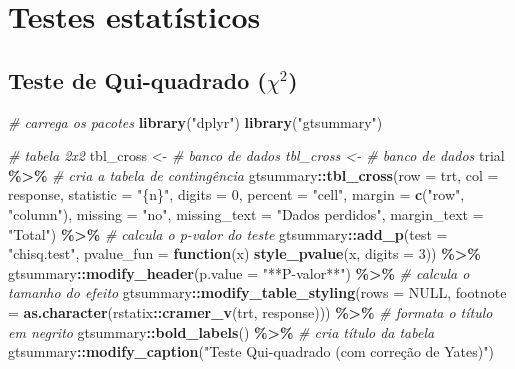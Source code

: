\documentclass[
]{book}
\newenvironment{Shaded}{\begin{snugshade}}{\end{snugshade}}
\newcommand{\AttributeTok}[1]{\textcolor[rgb]{0.13,0.29,0.53}{#1}}
\newcommand{\CommentTok}[1]{\textcolor[rgb]{0.56,0.35,0.01}{\textit{#1}}}
\newcommand{\ConstantTok}[1]{\textcolor[rgb]{0.56,0.35,0.01}{#1}}
\newcommand{\ControlFlowTok}[1]{\textcolor[rgb]{0.13,0.29,0.53}{\textbf{#1}}}
\newcommand{\DecValTok}[1]{\textcolor[rgb]{0.00,0.00,0.81}{#1}}
\newcommand{\FunctionTok}[1]{\textcolor[rgb]{0.13,0.29,0.53}{\textbf{#1}}}
\newcommand{\NormalTok}[1]{#1}
\newcommand{\OtherTok}[1]{\textcolor[rgb]{0.56,0.35,0.01}{#1}}
\newcommand{\SpecialCharTok}[1]{\textcolor[rgb]{0.81,0.36,0.00}{\textbf{#1}}}
\newcommand{\StringTok}[1]{\textcolor[rgb]{0.31,0.60,0.02}{#1}}
\begin{document}
\hypertarget{testes-estatisticos}{%
\chapter{\texorpdfstring{\textbf{Testes estatísticos}}{Testes estatísticos}}\label{testes-estatisticos}}

\hypertarget{teste-de-qui-quadrado-chi2}{%
\section{\texorpdfstring{Teste de Qui-quadrado (\(\chi^2\))}{Teste de Qui-quadrado (\textbackslash chi\^{}2)}}\label{teste-de-qui-quadrado-chi2}}

\begin{Shaded}
\begin{Highlighting}[]
\CommentTok{\# carrega os pacotes}
\FunctionTok{library}\NormalTok{(}\StringTok{"dplyr"}\NormalTok{)}
\FunctionTok{library}\NormalTok{(}\StringTok{"gtsummary"}\NormalTok{)}

\CommentTok{\# tabela 2x2}
\NormalTok{tbl\_cross }\OtherTok{\textless{}{-}} \CommentTok{\# banco de dados tbl\_cross \textless{}{-} \# banco de dados}
\NormalTok{trial }\SpecialCharTok{\%\textgreater{}\%}
    \CommentTok{\# cria a tabela de contingência}
\NormalTok{gtsummary}\SpecialCharTok{::}\FunctionTok{tbl\_cross}\NormalTok{(}\AttributeTok{row =}\NormalTok{ trt, }\AttributeTok{col =}\NormalTok{ response, }\AttributeTok{statistic =} \StringTok{"\{n\}"}\NormalTok{, }\AttributeTok{digits =} \DecValTok{0}\NormalTok{, }\AttributeTok{percent =} \StringTok{"cell"}\NormalTok{,}
    \AttributeTok{margin =} \FunctionTok{c}\NormalTok{(}\StringTok{"row"}\NormalTok{, }\StringTok{"column"}\NormalTok{), }\AttributeTok{missing =} \StringTok{"no"}\NormalTok{, }\AttributeTok{missing\_text =} \StringTok{"Dados perdidos"}\NormalTok{,}
    \AttributeTok{margin\_text =} \StringTok{"Total"}\NormalTok{) }\SpecialCharTok{\%\textgreater{}\%}
    \CommentTok{\# calcula o p{-}valor do teste}
\NormalTok{gtsummary}\SpecialCharTok{::}\FunctionTok{add\_p}\NormalTok{(}\AttributeTok{test =} \StringTok{"chisq.test"}\NormalTok{, }\AttributeTok{pvalue\_fun =} \ControlFlowTok{function}\NormalTok{(x) }\FunctionTok{style\_pvalue}\NormalTok{(x, }\AttributeTok{digits =} \DecValTok{3}\NormalTok{)) }\SpecialCharTok{\%\textgreater{}\%}
\NormalTok{    gtsummary}\SpecialCharTok{::}\FunctionTok{modify\_header}\NormalTok{(}\AttributeTok{p.value =} \StringTok{"**P{-}valor**"}\NormalTok{) }\SpecialCharTok{\%\textgreater{}\%}
    \CommentTok{\# calcula o tamanho do efeito}
\NormalTok{gtsummary}\SpecialCharTok{::}\FunctionTok{modify\_table\_styling}\NormalTok{(}\AttributeTok{rows =} \ConstantTok{NULL}\NormalTok{, }\AttributeTok{footnote =} \FunctionTok{as.character}\NormalTok{(rstatix}\SpecialCharTok{::}\FunctionTok{cramer\_v}\NormalTok{(trt,}
\NormalTok{    response))) }\SpecialCharTok{\%\textgreater{}\%}
    \CommentTok{\# formata o título em negrito}
\NormalTok{gtsummary}\SpecialCharTok{::}\FunctionTok{bold\_labels}\NormalTok{() }\SpecialCharTok{\%\textgreater{}\%}
    \CommentTok{\# cria título da tabela}
\NormalTok{gtsummary}\SpecialCharTok{::}\FunctionTok{modify\_caption}\NormalTok{(}\StringTok{"Teste Qui{-}quadrado (com correção de Yates)"}\NormalTok{)}


\end{Highlighting}
\end{Shaded}
\end{document}
